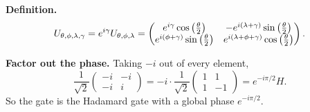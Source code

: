 \documentclass[a4paper, 10pt]{article}
\begin{document}
\begin{solution}
	\noindent \textbf{Definition.}
	\[
		U_{\theta, \phi, \lambda, \gamma} = e^{i\gamma}U_{\theta, \phi, \lambda} = \begin{pmatrix}
			e^{i\gamma}\cos\left(\frac{\theta}{2}\right)                 & -e^{i\left(\lambda + \gamma\right)}\sin\left(\frac{\theta}{2}\right)        \\
			e^{i\left(\phi + \gamma\right)}\sin\left(\frac{\theta}{2}\right) & e^{i\left(\lambda + \phi + \gamma\right)}\cos\left(\frac{\theta}{2}\right)
		\end{pmatrix}.
	\]

	\myspace

	\noindent \textbf{Factor out the phase.} Taking \( -i \) out of every element,
	\[
		\frac{1}{\sqrt{2}}\begin{pmatrix} -i & -i \\ -i & i \end{pmatrix} = -i \cdot \frac{1}{\sqrt{2}}\begin{pmatrix} 1 & 1 \\ 1 & -1 \end{pmatrix} = e^{-i\pi/2}H .
	\]
	So the gate is the Hadamard gate with a global phase \( e^{-i\pi/2} \).

	\myspace


\end{solution}
\end{document}
